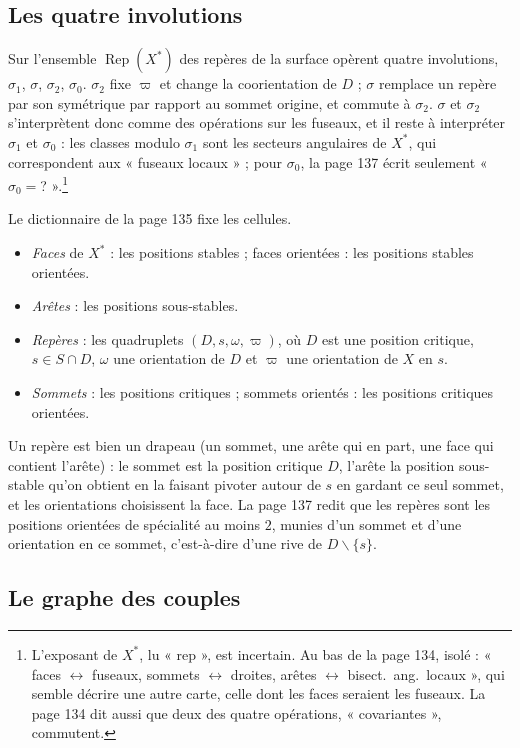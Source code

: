 \documentclass[11pt,a4paper]{article}
\begin{document}
\subsection*{Les quatre involutions}

Sur l'ensemble $\operatorname{Rep}(X^{*})$ des repères de la surface opèrent
quatre involutions, $\sigma_1$, $\sigma$, $\sigma_2$, $\sigma_0$. $\sigma_2$
fixe $\varpi$ et change la coorientation de $D$ ; $\sigma$ remplace un repère
par son symétrique par rapport au sommet origine, et commute à $\sigma_2$.
$\sigma$ et $\sigma_2$ s'interprètent donc comme des opérations sur les fuseaux,
et il reste à interpréter $\sigma_1$ et $\sigma_0$ : les classes modulo
$\sigma_1$ sont les secteurs angulaires de $X^{*}$, qui correspondent
aux « fuseaux locaux » ; pour $\sigma_0$, la page 137 écrit seulement
« $\sigma_0 = {}$? ».\footnote{L'exposant de $X^{*}$, lu « rep », est
incertain. Au bas de la page 134, isolé : « faces $\leftrightarrow$ fuseaux,
sommets $\leftrightarrow$ droites, arêtes $\leftrightarrow$ bisect.\ ang.\
locaux », qui semble décrire une autre carte, celle dont les faces seraient les
fuseaux. La page 134 dit aussi que deux des quatre opérations, « covariantes »,
commutent.}

Le dictionnaire de la page 135 fixe les cellules.
\begin{itemize}
\item \emph{Faces} de $X^{*}$ : les positions stables ; faces orientées :
les positions stables orientées.
\item \emph{Arêtes} : les positions sous-stables.
\item \emph{Repères} : les quadruplets $(D, s, \omega, \varpi)$, où $D$ est une
position critique, $s \in S \cap D$, $\omega$ une orientation de $D$ et
$\varpi$ une orientation de $X$ en $s$.
\item \emph{Sommets} : les positions critiques ; sommets orientés : les
positions critiques orientées.
\end{itemize}
Un repère est bien un drapeau (un sommet, une arête qui en part, une face qui
contient l'arête) : le sommet est la position critique $D$, l'arête la
position sous-stable qu'on obtient en la faisant pivoter autour de $s$ en
gardant ce seul sommet, et les orientations choisissent la face. La page 137
redit que les repères sont les positions orientées de spécialité au moins $2$,
munies d'un sommet et d'une orientation en ce sommet, c'est-à-dire d'une rive de
$D \smallsetminus \lbrace s \rbrace$.

\subsection*{Le graphe des couples}
\end{document}
